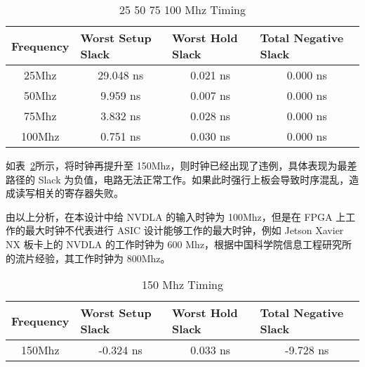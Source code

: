\begin{table}[!htbp]
    \caption{25 50 75 100 Mhz Timing}
    \label{tab:25-100 Mhz Timing}
    \centering
    \footnotesize%
    \setlength{\tabcolsep}{4pt}%
    \renewcommand{\arraystretch}{1.2}%
    \begin{tabular}{cccc}
        \toprule
        \multicolumn{1}{l}{\textbf{Frequency}} & \multicolumn{1}{l}{\textbf{Worst Setup Slack}} & \multicolumn{1}{l}{\textbf{Worst Hold Slack}} & \multicolumn{1}{l}{\textbf{Total Negative Slack}} \\
        \midrule
        25Mhz                                  & 29.048 ns                                      & 0.021 ns                                      & 0.000 ns                                          \\
        50Mhz                                  & 9.959 ns                                       & 0.007 ns                                      & 0.000 ns                                          \\
        75Mhz                                  & 3.832 ns                                       & 0.028 ns                                      & 0.000 ns                                          \\
        100Mhz                                 & 0.751 ns                                       & 0.030 ns                                      & 0.000 ns                                          \\
        \bottomrule                   
    \end{tabular}
\end{table}

如表~\ref{tab:150 Mhz Timing}所示，将时钟再提升至 150Mhz，则时钟已经出现了违例，具体表现为最差路径的 Slack 为负值，电路无法正常工作。如果此时强行上板会导致时序混乱，造成读写相关的寄存器失败。

由以上分析，在本设计中给 NVDLA 的输入时钟为 100Mhz，但是在 FPGA 上工作的最大时钟不代表进行 ASIC 设计能够工作的最大时钟，例如 Jetson Xavier NX 板卡上的 NVDLA 的工作时钟为 600 Mhz，根据中国科学院信息工程研究所的流片经验，其工作时钟为 800Mhz。

\begin{table}[!htbp]
    \caption{150 Mhz Timing}
    \label{tab:150 Mhz Timing}
    \centering
    \footnotesize%
    \setlength{\tabcolsep}{4pt}%
    \renewcommand{\arraystretch}{1.2}%
    \begin{tabular}{llll}
        \toprule
        \textbf{Frequency}         & \textbf{Worst Setup Slack}    & \textbf{Worst Hold Slack}    & \textbf{Total Negative Slack} \\
        \midrule
        \multicolumn{1}{c}{150Mhz} & \multicolumn{1}{c}{-0.324 ns} & \multicolumn{1}{c}{0.033 ns} & \multicolumn{1}{c}{-9.728 ns} \\
        \bottomrule                   
    \end{tabular}
\end{table}

